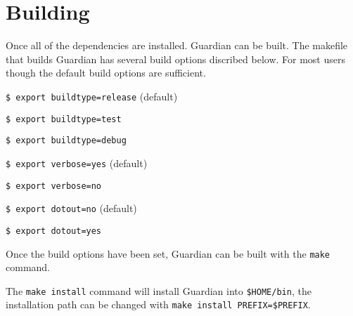 
\section{Building}
{
	Once all of the dependencies are installed. Guardian can be built. The
	makefile that builds Guardian has several build options discribed below.
	For most users though the default build options are sufficient.
	
	\begin{itemize}
	{
		\item {\texttt{\$ export buildtype=release} (default)}\\
		{
			\lipsum[1]
		}
		
		\item {\texttt{\$ export buildtype=test}}\\
		{
			\lipsum[1]
		}
		
		\item {\texttt{\$ export buildtype=debug}}\\
		{
			\lipsum[1]
		}
		
		\item {\texttt{\$ export verbose=yes} (default)}\\
		{
			\lipsum[1]
		}
		
		\item {\texttt{\$ export verbose=no}}\\
		{
			\lipsum[1]
		}
		
		\item {\texttt{\$ export dotout=no} (default)}\\
		{
			\lipsum[1]
		}
		
		\item {\texttt{\$ export dotout=yes}}\\
		{
			\lipsum[1]
		}
	}
	\end{itemize}
	
	Once the build options have been set, Guardian can be built with the
	\texttt{make} command.
	
	The \texttt{make install} command will install Guardian into
	\texttt{\${HOME}/bin}, the installation path can be changed with
	\texttt{make install PREFIX=\${PREFIX}}.
}
















